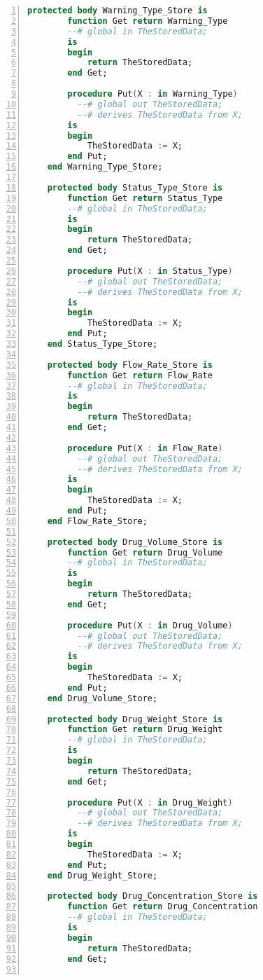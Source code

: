 \begin{lstlisting}[language=ada, gobble=0, numbers=left, caption={\lstinline{Pca_Types} package}, label={listing:pca_generated:pca_types}]
    protected body Warning_Type_Store is
        function Get return Warning_Type
        --# global in TheStoredData;
        is
        begin
            return TheStoredData;
        end Get;

        procedure Put(X : in Warning_Type)
          --# global out TheStoredData;
          --# derives TheStoredData from X;
        is
        begin
            TheStoredData := X;
        end Put;
    end Warning_Type_Store;

    protected body Status_Type_Store is
        function Get return Status_Type
        --# global in TheStoredData;
        is
        begin
            return TheStoredData;
        end Get;

        procedure Put(X : in Status_Type)
          --# global out TheStoredData;
          --# derives TheStoredData from X;
        is
        begin
            TheStoredData := X;
        end Put;
    end Status_Type_Store;

    protected body Flow_Rate_Store is
        function Get return Flow_Rate
        --# global in TheStoredData;
        is
        begin
            return TheStoredData;
        end Get;

        procedure Put(X : in Flow_Rate)
          --# global out TheStoredData;
          --# derives TheStoredData from X;
        is
        begin
            TheStoredData := X;
        end Put;
    end Flow_Rate_Store;

    protected body Drug_Volume_Store is
        function Get return Drug_Volume
        --# global in TheStoredData;
        is
        begin
            return TheStoredData;
        end Get;

        procedure Put(X : in Drug_Volume)
          --# global out TheStoredData;
          --# derives TheStoredData from X;
        is
        begin
            TheStoredData := X;
        end Put;
    end Drug_Volume_Store;

    protected body Drug_Weight_Store is
        function Get return Drug_Weight
        --# global in TheStoredData;
        is
        begin
            return TheStoredData;
        end Get;

        procedure Put(X : in Drug_Weight)
          --# global out TheStoredData;
          --# derives TheStoredData from X;
        is
        begin
            TheStoredData := X;
        end Put;
    end Drug_Weight_Store;

    protected body Drug_Concentration_Store is
        function Get return Drug_Concentration
        --# global in TheStoredData;
        is
        begin
            return TheStoredData;
        end Get;


\end{lstlisting}
